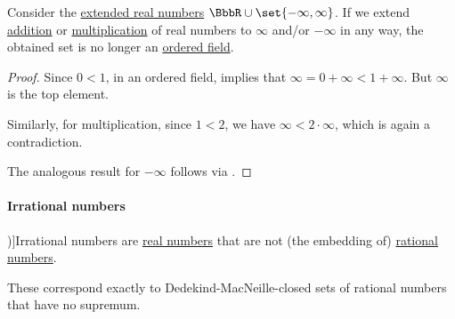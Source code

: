 \begin{proposition}\label{thm:extended_real_numbers_are_not_field}
  Consider the \hyperref[def:extended_real_numbers]{extended real numbers} \( \BbbR \cup \set{ -\infty, \infty } \). If we extend \hyperref[def:real_number_arithmetic/addition]{addition} or \hyperref[def:real_number_arithmetic/multiplication]{multiplication} of real numbers to \( \infty \) and/or \( -\infty \) in any way, the obtained set is no longer an \hyperref[def:ordered_semiring]{ordered field}.
\end{proposition}
\begin{proof}
  Since \( 0 < 1 \), in an ordered field,  implies that \( \infty = 0 + \infty < 1 + \infty \). But \( \infty \) is the top element.

  Similarly, for multiplication, since \( 1 < 2 \), we have \( \infty < 2 \cdot \infty \), which is again a contradiction.

  The analogous result for \( -\infty \) follows via .
\end{proof}

\paragraph{Irrational numbers}

\begin{definition}\label{def:irrational_numbers}\mimprovised
  \term[ru=иррациональные числа (\cite[36]{Александров1977Топология})]{Irrational numbers} are \hyperref[def:real_numbers]{real numbers} that are not (the embedding of) \hyperref[def:rational_numbers]{rational numbers}.
\end{definition}
\begin{comments}
  \item These correspond exactly to Dedekind-MacNeille-closed sets of rational numbers that have no supremum.
\end{comments}

